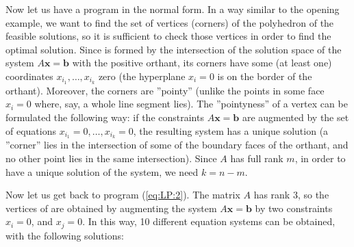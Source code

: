 \noindent 
Now let us have a program in the normal form. In a way similar to the opening example,
we want to find the set of vertices (corners) of the polyhedron \dom of the feasible solutions,
so it is sufficient to check those vertices in order to find the optimal solution.
Since \dom is formed by the intersection of the solution space of the system $A\bm{x}=\bm{b}$
with the positive orthant, its corners have some (at least one)  coordinates 
$x_{i_1},\ldots,x_{i_k}$ zero (the hyperplane $x_i=0$ is on the border of the orthant). 
Moreover, the corners are ''pointy'' (unlike the points in some face $x_i=0$ where, say,
a whole line segment lies). The ''pointyness'' of a vertex can be formulated the following
way: if the constraints $A\bm{x}=\bm{b}$
are augmented by the set of equations  $x_{i_1}=0,\ldots,x_{i_k}=0$,
the resulting system has a unique solution (\ie a ''corner'' lies in the 
intersection of some of the boundary faces of the orthant, and no other point lies
in the same intersection). Since $A$ has full rank $m$, in order to have a unique
solution of the system, we need $k=n-m$. 

\noindent Now let us get back to program (\ref{eq:LP:2}).  The matrix $A$ has rank 3,
so the vertices of \dom are obtained by augmenting the system  $A\bm{x}=\bm{b}$ 
by two constraints $x_i=0$, and $x_j=0$. In this way, 10 different equation systems can 
be obtained, with the following solutions:



